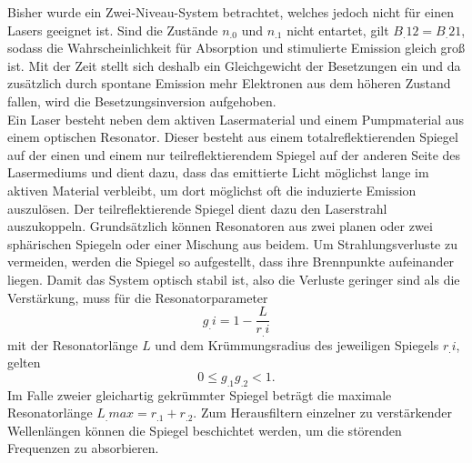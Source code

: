 Bisher wurde ein Zwei-Niveau-System betrachtet, welches jedoch nicht für einen Lasers geeignet ist. Sind die Zustände $n_.0$ und $n_.1$ nicht entartet, gilt $B_.{12}=B_.{21}$, sodass die Wahrscheinlichkeit für Absorption und stimulierte Emission gleich groß ist. Mit der Zeit stellt sich deshalb ein Gleichgewicht der Besetzungen ein und da zusätzlich durch spontane Emission mehr Elektronen aus dem höheren Zustand fallen, wird die Besetzungsinversion aufgehoben.\\ 
Ein Laser besteht neben dem aktiven Lasermaterial und einem Pumpmaterial aus einem optischen Resonator.
Dieser besteht aus einem totalreflektierenden Spiegel auf der einen und einem nur teilreflektierendem Spiegel auf der anderen Seite des Lasermediums und dient dazu, dass das emittierte Licht möglichst lange im aktiven Material verbleibt, um dort möglichst oft die induzierte Emission auszulösen. Der teilreflektierende Spiegel dient dazu den Laserstrahl auszukoppeln. Grundsätzlich können Resonatoren aus zwei planen oder zwei sphärischen Spiegeln oder einer Mischung aus beidem. Um Strahlungsverluste zu vermeiden, werden die Spiegel so aufgestellt, dass ihre Brennpunkte aufeinander liegen. Damit das System optisch stabil ist, also die Verluste geringer sind als die Verstärkung, muss für die Resonatorparameter
\[
g_.i = 1 - \frac{L}{r_.i}
\]
mit der Resonatorlänge $L$ und dem Krümmungsradius des jeweiligen Spiegels $r_.i$, gelten
\begin{equation}
0 \leq g_.1g_.2 < 1\text{.}\label{eq:stabil}
\end{equation}
Im Falle zweier gleichartig gekrümmter Spiegel beträgt die maximale Resonatorlänge $L_.{max}=r_.1+r_.2$.
Zum Herausfiltern einzelner zu verstärkender Wellenlängen können die Spiegel beschichtet werden, um die störenden Frequenzen zu absorbieren.


